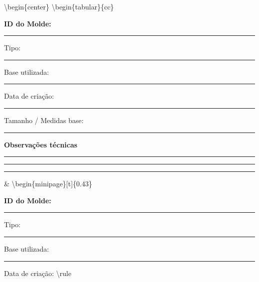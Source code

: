 \documentclass[
]{article}
\begin{document}
\vspace{0.6cm}

\hdashrule{\textwidth}{0.5pt}{3mm 2mm}

\vspace{0.8cm}

\textbackslash begin\{center\} \setlength{\tabcolsep}{24pt}
\renewcommand{\arraystretch}{1.2} \textbackslash begin\{tabular\}\{cc\}

\begin{minipage}[t]{0.43\textwidth}
\normalsize

\textbf{ID do Molde:} \rule{4cm}{0.5pt}

\vspace{0.4cm}

Tipo: \rule{5cm}{0.4pt}

Base utilizada: \rule{4cm}{0.4pt}

Data de criação: \rule{3cm}{0.4pt}

Tamanho / Medidas base: \rule{4cm}{0.4pt}

\vspace{0.4cm}

\textbf{Observações técnicas}

\rule{\textwidth}{0.4pt}

\rule{\textwidth}{0.4pt}

\rule{\textwidth}{0.4pt}

\end{minipage}

\& \textbackslash begin\{minipage\}{[}t{]}\{0.43\textwidth\} \normalsize

\textbf{ID do Molde:}

\rule{4cm}{0.5pt}

\vspace{0.4cm}

Tipo:

\rule{5cm}{0.4pt}

Base utilizada:

\rule{4cm}{0.4pt}

Data de criação: \textbackslash rule
\end{document}
